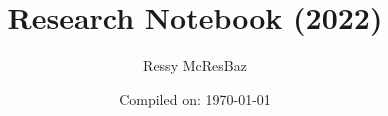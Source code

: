 \documentclass[openany,onecolumn,oneside]{memoir}
\begin{document}

\title{Research Notebook (2022)}
\author{Ressy McResBaz}
\date{Compiled on: \today }
\maketitle
\clearpage



\begin{KeepFromToc}
    \tableofcontents
\end{KeepFromToc}

\newpage
\newpage
{}




%

%
%
%
%
%
%
%
%
%





\appendixpage
\label{appendixpage}
 
%
\onecolumn




{}





\renewcommand*{\bibfont}{\footnotesize}

%
%

\printbibliography{}
\end{document}
